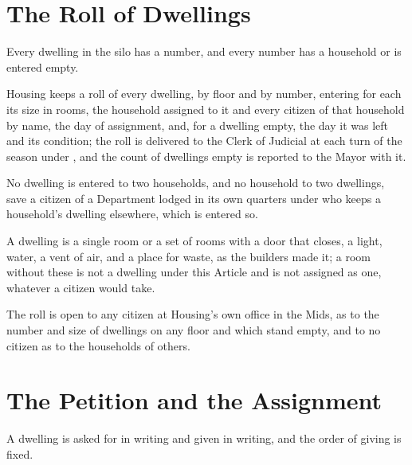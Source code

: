 \section{The Roll of Dwellings}
\label{sec:housing:roll-of-dwellings}

Every dwelling in the silo has a number, and every number has a household or is entered empty.

\begin{clauses}
\item Housing keeps a roll of every dwelling, by floor and by number, entering for each its size in rooms, the household assigned to it and every citizen of that household by name, the day of assignment, and, for a dwelling empty, the day it was left and its condition; the roll is delivered to the Clerk of Judicial at each turn of the season under , and the count of dwellings empty is reported to the Mayor with it.
\item No dwelling is entered to two households, and no household to two dwellings, save a citizen of a Department lodged in its own quarters under  who keeps a household's dwelling elsewhere, which is entered so.
\item A dwelling is a single room or a set of rooms with a door that closes, a light, water, a vent of air, and a place for waste, as the builders made it; a room without these is not a dwelling under this Article and is not assigned as one, whatever a citizen would take.
\item The roll is open to any citizen at Housing's own office in the Mids, as to the number and size of dwellings on any floor and which stand empty, and to no citizen as to the households of others.
\end{clauses}

\section{The Petition and the Assignment}
\label{sec:housing:petition-and-the-assignment}

A dwelling is asked for in writing and given in writing, and the order of giving is fixed.

